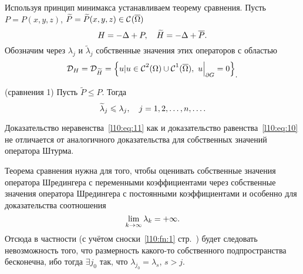 Используя принцип минимакса устанавливаем теорему сравнения. Пусть $P=P(x,y,z)$, $\widetilde{P}=\widetilde{P}(x,y,z)\in\mathcal{C}{\mathstrut}^{}_{}(\overline{\Omega})$
\begin{equation*}
	\hfill H=-\Delta+P,\quad \widetilde{H}=-\Delta+\overline{P}.\hfill
\end{equation*}
Обозначим через $\lambda_j$ и $\widetilde{\lambda}_j$ собственные значения этих операторов с областью 
\begin{equation*}
	\hfill\mc{D}_{H}=\mc{D}_{\widetilde{H}}=\left\{u|u\in\Cfn{2}(\Omega)\cup\Cfn{1}(\overline{\Omega}),\ u\Big|_{\partial G}=0\right\}_{\displaystyle.}\hfill
\end{equation*}
\begin{_teor}(сравнения 1)
	Пусть $\widetilde{P}\leqslant P$. Тогда 
	\begin{equation}\label{l10:eq:11}
		\hfill\widetilde{\lambda}_j\leqslant\lambda_j,\quad j=1,2,\ldots,n,\ldots.\hfill
	\end{equation}
\end{_teor}
Доказательство неравенства~\eqref{l10:eq:11} как и доказательство равенства~\eqref{l10:eq:10} не отличается от аналогичного доказательства для собственных значений оператора Штурма.

Теорема сравнения нужна для того, чтобы оценивать собственные значения оператора Шредингера с переменными коэффициентами через собственные значения оператора Шредингера с постоянными коэффициентами и особенно для доказательства соотношения
\begin{equation*}
	\hfill\lim\limits_{k\to\infty}\lambda_k=+\infty.\hfill
\end{equation*}
Отсюда в частности (с учётом сноски~\ref{l10:fn:1} стр.~\pageref{l10:fn:1}) будет следовать невозможность того, что размерность какого-то собственного подпространства бесконечна, ибо тогда $\exists j_0$ так, что $\lambda_{j_0}=\lambda_s$, $s>j$.

